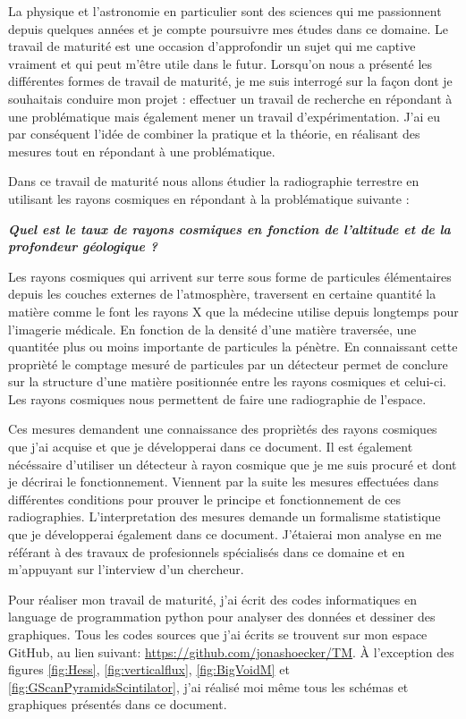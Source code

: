 \documentclass[a4paper, 12pt]{article}
\begin{document}
\begin{spacing}{1.5}
La physique et l'astronomie en particulier sont des sciences qui me passionnent depuis quelques années et je compte poursuivre mes études dans ce domaine. Le travail de maturité est une occasion d'approfondir un sujet qui me captive vraiment et qui peut m'être utile dans le futur. Lorsqu'on nous a présenté les différentes formes de travail de maturité, je me suis interrogé sur la façon dont je souhaitais conduire mon projet : effectuer un travail de recherche en répondant à une problématique mais également mener un travail d'expérimentation. J'ai eu par conséquent l'idée de combiner la pratique et la théorie, en réalisant des mesures tout en répondant à une problématique.

Dans ce travail de maturité nous allons étudier la radiographie terrestre en utilisant les rayons cosmiques en répondant à la problématique suivante : 
\begin{center}
\textbf{\emph{Quel est le taux de rayons cosmiques en fonction de l'altitude et de la profondeur géologique ?}}
\end{center}

Les rayons cosmiques qui arrivent sur terre sous forme de particules élémentaires depuis les couches externes de l'atmosphère, traversent en certaine quantité la matière comme le font les rayons X que la médecine utilise depuis longtemps pour l'imagerie médicale. En fonction de la densité d'une matière traversée, une quantitée plus ou moins importante de particules la pénètre. En connaissant cette proprièté le comptage mesuré de particules par un détecteur permet de conclure sur la structure d'une matière positionnée entre les rayons cosmiques et celui-ci. Les rayons cosmiques nous permettent de faire une radiographie de l'espace.

Ces mesures demandent une connaissance des propriètés des rayons cosmiques que j'ai acquise et que je développerai dans ce document. Il est également nécéssaire d'utiliser un détecteur à rayon cosmique que je me suis procuré et dont je décrirai le fonctionnement. Viennent par la suite les mesures effectuées dans différentes conditions pour prouver le principe et fonctionnement de ces radiographies. L'interpretation des mesures demande un formalisme statistique que je développerai également dans ce document. J'étaierai mon analyse en me référant à des travaux de profesionnels spécialisés dans ce domaine et en m'appuyant sur l'interview d'un chercheur.

Pour réaliser mon travail de maturité, j'ai écrit des codes informatiques en language de programmation python pour analyser des données et dessiner des graphiques. Tous les codes sources que j'ai écrits se trouvent sur mon espace GitHub, au lien suivant: \url{https://github.com/jonashoecker/TM}. À l'exception des figures \ref{fig:Hess}, \ref{fig:verticalflux}, \ref{fig:BigVoidM} et \ref{fig:GScanPyramidsScintilator}, j'ai réalisé moi même tous les schémas et graphiques présentés dans ce document.



\end{spacing}
\end{document}
